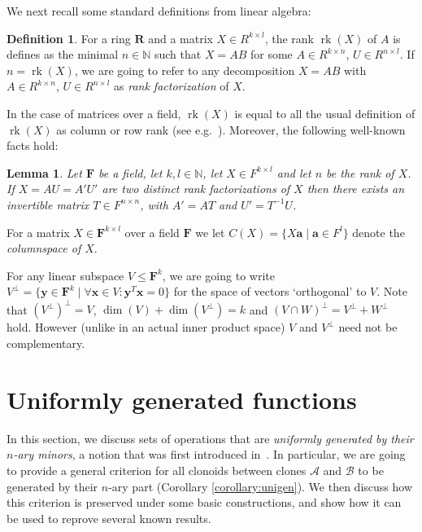 \documentclass[11pt]{amsart}
\theoremstyle{plain}
\newtheorem{lemma}[thm]{Lemma}
\theoremstyle{definition}
\newtheorem{definition}[thm]{Definition}
\newcommand{\N}{{\mathbb N}}
\newcommand{\F}{{\mathbf F}}
\newcommand{\alg}[1]{\mathbf{#1}}
\newcommand{\clone}[1]{\mathcal{#1}}
\newcommand{\algR}{\alg{R}}
\newcommand{\cloA}{\clone{A}}
\newcommand{\cloB}{\clone{B}}
\renewcommand\vec{\mathbf}
\newcommand{\va}{\vec{a}}
\newcommand{\vb}{\vec{b}}
\newcommand{\vx}{\vec{x}}
\newcommand{\vy}{\vec{y}}
\DeclareMathOperator{\rk}{rk}
\begin{document}
We next recall some standard definitions from linear algebra:

\begin{definition}
For a ring $\algR$ and a matrix $X \in R^{k \times l}$, the rank $\rk(X)$ of $A$ is defines as the minimal $n \in \N$ such that $X = AB$ for some $A \in  R^{k \times n}$, $U \in R^{n \times l}$. If $n = \rk(X)$, we are going to refer to any decomposition $X = AB$ with $A \in  R^{k \times n}$, $U \in R^{n \times l}$ as \emph{rank factorization} of $X$.
\end{definition}

In the case of matrices over a field, $\rk(X)$ is equal to all the usual definition of $\rk(X)$ as column or row rank (see e.g.~\cite[Section 5.4]{BR-linearalgebra}). Moreover, the following well-known facts hold:

\begin{lemma}\label{lemma:the wellknown remark}
Let $\F$ be a field, let $k,l\in\N$, let $X \in F^{k \times l}$ and let $n$ be the rank of $X$. If $X = AU = A'U'$ are two distinct rank factorizations of $X$ then there exists an invertible matrix 
$T \in F^{n\times n}$, 
with $A' = AT$ and $U' = T^{-1}U$.
\end{lemma}

For a matrix $X \in \F^{k \times l}$ over a field $\F$ we let $C(X) = \{ X\va \mid \va \in F^l \}$ denote the \emph{columnspace of $X$}.


For any linear subspace $V\leq \F^k$, we are going to write $V^{\bot} = \{\vy \in \F^k \mid \forall \vx \in V: \vy^T \vx = 0 \}$ for the space of vectors `orthogonal' to $V$. Note that $(V^{\bot})^{\bot} = V$, $\dim(V) + \dim(V^\bot) = k$ and $(V\cap W)^\bot = V^{\bot} + W^{\bot}$ hold. However (unlike in an actual inner product space) $V$ and $V^{\bot}$ need not be complementary.

\section{Uniformly generated functions}\label{sec:unifgen}

In this section, we discuss sets of operations that are \emph{uniformly generated by their $n$-ary minors}, a notion that was first introduced in~\cite{MW-clonoidsmodules}. In particular, we are going to provide a general criterion for all clonoids between clones $\cloA$ and $\cloB$ to be generated by their $n$-ary part (Corollary \ref{corollary:unigen}). We then discuss how this criterion is preserved under some basic constructions, and show how it can be used to reprove several known results.
\end{document}
